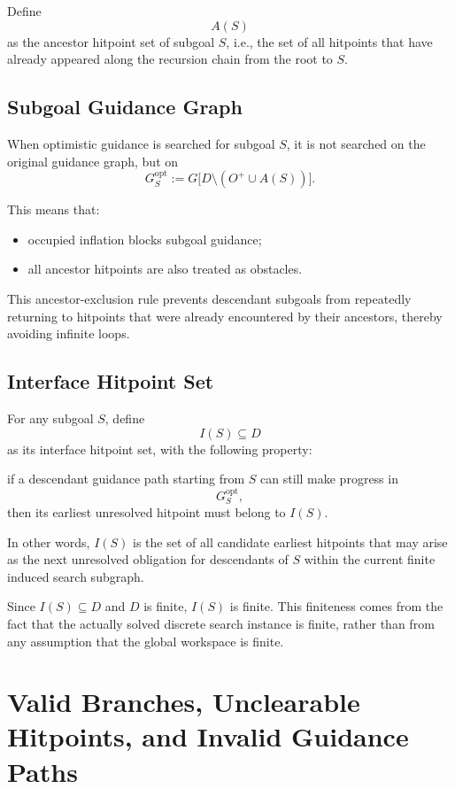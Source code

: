 \documentclass[11pt]{article}
\begin{document}
Define
\[
A(S)
\]
as the ancestor hitpoint set of subgoal $S$, i.e., the set of all hitpoints that have already appeared along the recursion chain from the root to $S$.

\subsection{Subgoal Guidance Graph}

When optimistic guidance is searched for subgoal $S$, it is not searched on the original guidance graph, but on
\[
G^{\mathrm{opt}}_S := G\big[D\setminus (O^{+}\cup A(S))\big].
\]

This means that:
\begin{itemize}[leftmargin=2em]
    \item occupied inflation blocks subgoal guidance;
    \item all ancestor hitpoints are also treated as obstacles.
\end{itemize}

This ancestor-exclusion rule prevents descendant subgoals from repeatedly returning to hitpoints that were already encountered by their ancestors, thereby avoiding infinite loops.

\subsection{Interface Hitpoint Set}

For any subgoal $S$, define
\[
I(S)\subseteq D
\]
as its interface hitpoint set, with the following property:

if a descendant guidance path starting from $S$ can still make progress in
\[
G^{\mathrm{opt}}_S,
\]
then its earliest unresolved hitpoint must belong to $I(S)$.

In other words, $I(S)$ is the set of all candidate earliest hitpoints that may arise as the next unresolved obligation for descendants of $S$ within the current finite induced search subgraph.

Since $I(S)\subseteq D$ and $D$ is finite, $I(S)$ is finite. This finiteness comes from the fact that the actually solved discrete search instance is finite, rather than from any assumption that the global workspace is finite.

\section{Valid Branches, Unclearable Hitpoints, and Invalid Guidance Paths}
\end{document}
